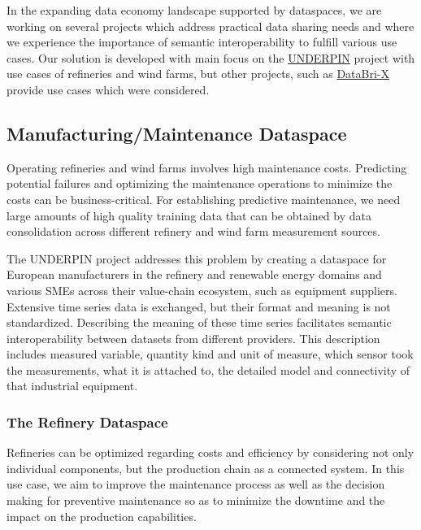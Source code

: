 \documentclass[
  super,
  preprint,
  3p]{elsarticle}
\begin{document}
In the expanding data economy landscape supported by dataspaces, we are
working on several projects which address practical data sharing needs
and where we experience the importance of semantic interoperability to
fulfill various use cases. Our solution is developed with main focus on
the \href{https://underpinproject.eu/}{UNDERPIN} project with use cases
of refineries and wind farms, but other projects, such as
\href{https://databri-x.eu/}{DataBri-X} provide use cases which were
considered.

\subsection{Manufacturing/Maintenance
Dataspace}\label{manufacturingmaintenance-dataspace}

Operating refineries and wind farms involves high maintenance costs.
Predicting potential failures and optimizing the maintenance operations
to minimize the costs can be business-critical. For establishing
predictive maintenance, we need large amounts of high quality training
data that can be obtained by data consolidation across different
refinery and wind farm measurement sources.

The UNDERPIN project addresses this problem by creating a dataspace for
European manufacturers in the refinery and renewable energy domains and
various SMEs across their value-chain ecosystem, such as equipment
suppliers. Extensive time series data is exchanged, but their format and
meaning is not standardized. Describing the meaning of these time series
facilitates semantic interoperability between datasets from different
providers. This description includes measured variable, quantity kind
and unit of measure, which sensor took the measurements, what it is
attached to, the detailed model and connectivity of that industrial
equipment.

\subsubsection{The Refinery Dataspace}\label{the-refinery-dataspace}

Refineries can be optimized regarding costs and efficiency by
considering not only individual components, but the production chain as
a connected system. In this use case, we aim to improve the maintenance
process as well as the decision making for preventive maintenance so as
to minimize the downtime and the impact on the production capabilities.
\end{document}
